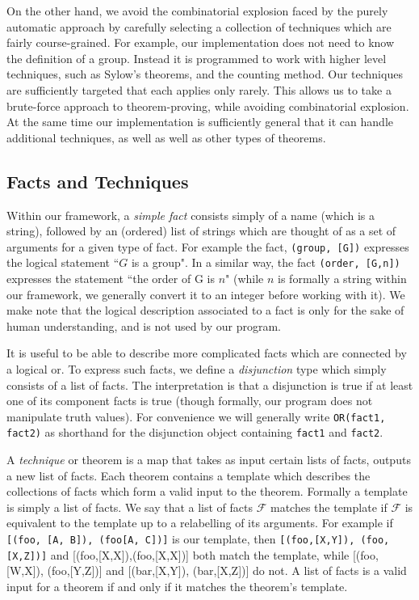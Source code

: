 \documentclass[11pt,
oneside]{article} %
\begin{document}
On the other hand, we avoid the combinatorial explosion faced by the
purely automatic approach by carefully selecting a collection of
techniques which are fairly course-grained.  For example, our
implementation does not need to know the definition of a group.
Instead it is programmed to work with higher level techniques, such as
Sylow's theorems, and the counting method.  Our techniques are
sufficiently targeted that each applies only rarely.  This allows us
to take a brute-force approach to theorem-proving, while avoiding
combinatorial explosion.  At the same time our implementation is
sufficiently general that it can handle additional techniques, as well
as well as other types of theorems.

\subsection{Facts and Techniques}

Within our framework, a \textit{simple fact} consists simply of a name
(which is a string), followed by an (ordered) list of strings which
are thought of as a set of arguments for a given type of fact.  For
example the fact, \texttt{(group, [G])} expresses the logical
statement ``$G$ is a group". In a similar way, the fact
\texttt{(order, [G,n])} expresses the statement ``the order of G is
$n$" (while $n$ is formally a string within our framework, we
generally convert it to an integer before working with it).  We make
note that the logical description associated to a fact is only for the
sake of human understanding, and is not used by our program.

It is useful to be able to describe more complicated facts which are
connected by a logical or.  To express such facts, we define a
\textit{disjunction} type which simply consists of a list of facts.
The interpretation is that a disjunction is true if at least one of
its component facts is true (though formally, our program does not
manipulate truth values).  For convenience we will generally write
\texttt{OR(fact1, fact2)} as shorthand for the disjunction object
containing \texttt{fact1} and \texttt{fact2}.

A \textit{technique} or theorem is a map that takes as input certain
lists of facts, outputs a new list of facts.  Each theorem contains a
template which describes the collections of facts which form a valid
input to the theorem.  Formally a template is simply a list of facts.
We say that a list of facts $\mathcal{F}$ matches the template if
$\mathcal{F}$ is equivalent to the template up to a relabelling of its
arguments.  For example if \texttt{[(foo, [A, B]), (foo[A, C])]} is
our template, then \texttt{[(foo,[X,Y]), (foo,[X,Z])]} and
[(foo,[X,X]),(foo,[X,X])] both match the template, while [(foo,[W,X]),
(foo,[Y,Z])] and [(bar,[X,Y]), (bar,[X,Z])] do not.  A list of facts
is a valid input for a theorem if and only if it matches the theorem's
template.
\end{document}
